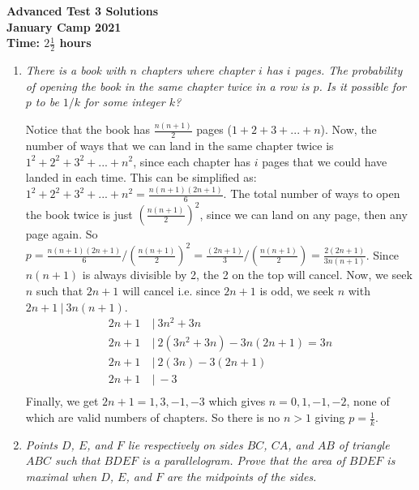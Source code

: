 \documentclass{article}
\begin{document}
\thispagestyle{empty}

\begin{center}
  \textbf{\Large Advanced Test 3 Solutions}
  \\ \vspace{1em}
  \textbf{\large January Camp 2021}
  \\ \vspace{1em}
  \textbf{\large Time: $2\frac{1}{2}$ hours}
\end{center}

\vspace{12pt}

\begin{enumerate}[1.]

\item %
{\itshape There is a book with $n$ chapters where chapter $i$ has $i$ pages.
The probability of opening the book in the same chapter twice in a row is $p$.
Is it possible for $p$ to be $1/k$ for some integer $k$?}

Notice that the book has $\frac{n(n+1)}{2}$ pages ($1+2+3+...+n$). Now, the number of ways that we can land in the same chapter twice is $1^2+2^2+3^2+...+n^2$, since each chapter has $i$ pages that we could have landed in each time. This can be simplified as: $1^2+2^2+3^2+...+n^2 = \frac{n(n+1)(2n+1)}{6}$. The total number of ways to open the book twice is just $(\frac{n(n+1)}{2})^2$, since we can land on any page, then any page again. So $p = \frac{n(n+1)(2n+1)}{6}/(\frac{n(n+1)}{2})^2 = \frac{(2n+1)}{3}/(\frac{n(n+1)}{2})=\frac{2(2n+1)}{3n(n+1)}$. Since $n(n+1)$ is always divisible by 2, the 2 on the top will cancel. Now, we seek $n$ such that $2n+1$ will cancel i.e. since $2n+1$ is odd, we seek $n$ with $2n+1\:|\: 3n(n+1)$.
\begin{align*}
2n+1\:&|\: 3n^2+3n\\
2n+1\:&|\: 2(3n^2+3n)-3n(2n+1) = 3n\\
2n+1\:&|\: 2(3n)-3(2n+1)\\
2n+1\:&|\: -3\\
\end{align*}
Finally, we get $2n+1=1,3,-1,-3$ which gives $n=0,1,-1,-2$, none of which are valid numbers of chapters. So there is no $n>1$ giving $p=\frac{1}{k}$.


\item %
{\itshape Points $D$, $E$, and $F$ lie respectively on sides $BC$, $CA$, and $AB$ of triangle $ABC$ such that $BDEF$ is a parallelogram. Prove that the area of $BDEF$ is maximal when $D$, $E$, and $F$ are the midpoints of the sides.}


\end{enumerate}
\end{document}
